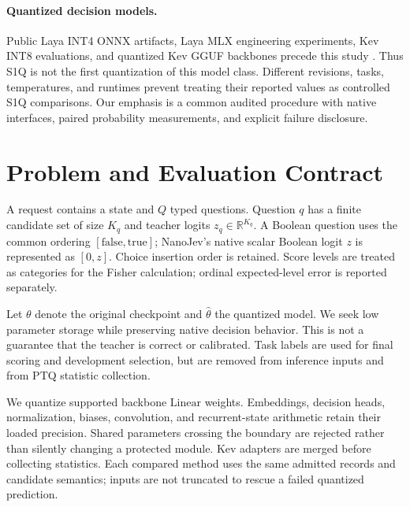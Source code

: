 \documentclass[10pt,twocolumn]{article}
\newcommand{\R}{\mathbb R}
\begin{document}
\paragraph{Quantized decision models.}
Public Laya INT4 ONNX artifacts, Laya MLX engineering experiments,
Kev INT8 evaluations, and quantized Kev GGUF backbones precede this study
\cite{androidli2026laya,mizore2026laya,kev2026issue162,dreamblooms2026kev}.
Thus S1Q is not the first quantization of this model class.
Different revisions, tasks, temperatures, and runtimes prevent treating
their reported values as controlled S1Q comparisons. Our emphasis is a
common audited procedure with native interfaces, paired probability
measurements, and explicit failure disclosure.

\section{Problem and Evaluation Contract}
A request contains a state and $Q$ typed questions. Question $q$ has a
finite candidate set of size $K_q$ and teacher logits
$z_q\in\R^{K_q}$. A Boolean question uses the common ordering
$[\mathrm{false},\mathrm{true}]$; NanoJev's native scalar Boolean logit
$z$ is represented as $[0,z]$. Choice insertion order is retained.
Score levels are treated as categories for the Fisher calculation;
ordinal expected-level error is reported separately.

Let $\theta$ denote the original checkpoint and $\widehat\theta$ the
quantized model. We seek low parameter storage while preserving native
decision behavior. This is not a guarantee that the teacher is correct
or calibrated. Task labels are used for final scoring and development
selection, but are removed from inference inputs and from PTQ statistic
collection.

We quantize supported backbone $\mathrm{Linear}$ weights.
Embeddings, decision heads, normalization, biases, convolution,
and recurrent-state arithmetic retain their loaded precision.
Shared parameters crossing the boundary are rejected rather than
silently changing a protected module. Kev adapters are merged before
collecting statistics. Each compared method uses the same admitted
records and candidate semantics; inputs are not truncated to rescue
a failed quantized prediction.
\end{document}

